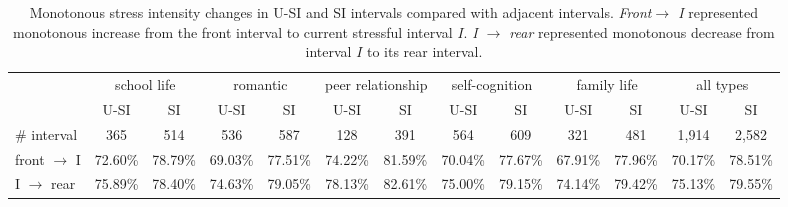 \begin{table}
\begin{center}
\caption{\small{Monotonous stress intensity changes in U-SI and SI intervals compared with adjacent intervals.
 \emph{Front$ \rightarrow$ I} represented monotonous increase from the front interval to current stressful interval $I$.
\emph{I $\rightarrow$ rear} represented monotonous decrease from interval $I$ to its rear interval.
}}
\small{
\begin{tabular}{l cccccc cccccc} \\\hline
\multirow{2}{1cm}{}
&\multicolumn{2}{c}{school life}
&\multicolumn{2}{c}{romantic}
&\multicolumn{2}{c}{peer relationship}
&\multicolumn{2}{c}{self-cognition}
&\multicolumn{2}{c}{family life}
&\multicolumn{2}{c}{all types}\\
&U-SI	    &	SI	        &U-SI	    &SI	        &U-SI	   &SI	
&U-SI	    &	SI	        &	U-SI	&SI	        &U-SI	   &SI\\  \hline
\# interval         &   365	        &	514	        &	536	        &	587	        &128	    &	391	        &	564	           &	609	            &	321	        &	481	        &	1,914	    &2,582	 \\
front $\rightarrow$ I &	72.60\% &	78.79\% &	69.03\% 	&77.51\%   &74.22\%    &81.59\%    &70.04\%    &77.67\%  &67.91\%     &77.96\%    &70.17\%    &78.51\% \\
I $\rightarrow$ rear  &	75.89\% &	78.40\% &	74.63\% 	&79.05\%   &78.13\%    &82.61\%    &75.00\%    &79.15\%   &74.14\%    &79.42\%    &75.13\%    & 79.55\%\\ \hline
\end{tabular}}%
\label{tab:fontrear}
\end{center}
\end{table}

